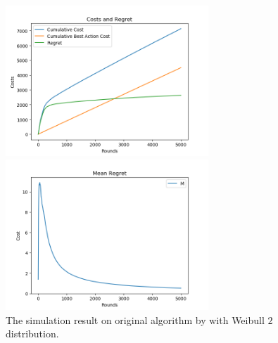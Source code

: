 \documentclass{article}
\theoremstyle{plain}
\theoremstyle{definition}
\theoremstyle{remark}
\begin{document}
    \begin{figure}[htbp!]
        \begin{minipage}[h]{0.5\linewidth}
            \centering
            \includegraphics[width=3in]{simple-cost-regret-weibull2.png}
        \end{minipage}
        \begin{minipage}[h]{0.5\linewidth}
            \centering
            \includegraphics[width=3in]{simple-mean-regret-weibull2.png}
        \end{minipage}
        \caption{The simulation result on original algorithm by \citet{pmlr-v28-chen13a} with Weibull $2$ distribution.}
        \label{center-weibull2-ori}
    \end{figure}
\end{document}
